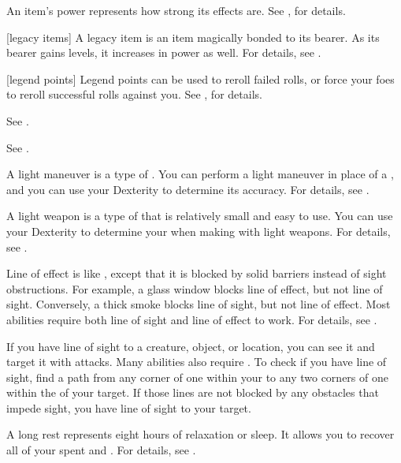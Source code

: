  An item's power represents how strong its effects are.
See , for details.

[legacy items] A legacy item is an item magically bonded to its bearer.
As its bearer gains levels, it increases in power as well.
For details, see .

[legend points] Legend points can be used to reroll failed rolls, or force your foes to reroll successful rolls against you. See , for details.

 See .

 See .

 A light maneuver is a type of .
You can perform a light maneuver in place of a , and you can use your Dexterity to determine its accuracy.
For details, see .

 A light weapon is a type of  that is relatively small and easy to use.
You can use your Dexterity to determine your  when making  with light weapons.
For details, see .

 Line of effect is like , except that it is blocked by solid barriers instead of sight obstructions.
For example, a glass window blocks line of effect, but not line of sight.
Conversely, a thick smoke blocks line of sight, but not line of effect.
Most abilities require both line of sight and line of effect to work.
For details, see .

 If you have line of sight to a creature, object, or location, you can see it and target it with attacks.
Many abilities also require .
To check if you have line of sight, find a path from any corner of one  within your  to any two corners of one  within the  of your target.
If those lines are not blocked by any obstacles that impede sight, you have line of sight to your target.

 A long rest represents eight hours of relaxation or sleep.
It allows you to recover all of your spent  and .
For details, see .

